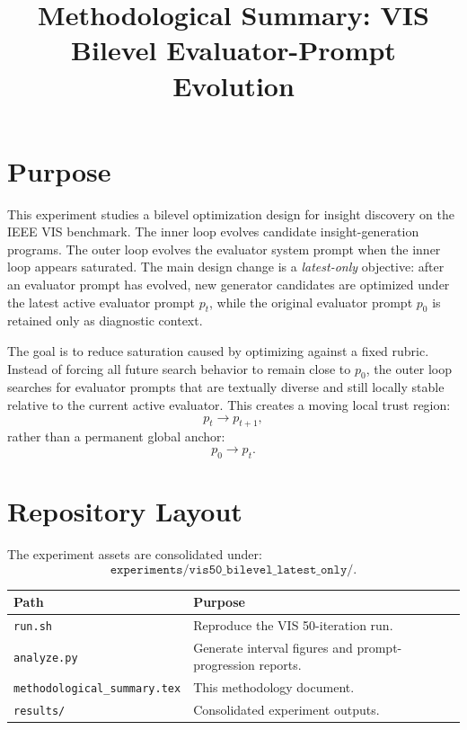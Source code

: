 \documentclass[11pt]{article}
\title{Methodological Summary: VIS Bilevel Evaluator-Prompt Evolution}
\author{}
\date{}
\begin{document}
\maketitle

\section{Purpose}

This experiment studies a bilevel optimization design for insight discovery on the
IEEE VIS benchmark. The inner loop evolves candidate insight-generation programs.
The outer loop evolves the evaluator system prompt when the inner loop appears
saturated. The main design change is a \emph{latest-only} objective: after an
evaluator prompt has evolved, new generator candidates are optimized under the
latest active evaluator prompt \(p_t\), while the original evaluator prompt
\(p_0\) is retained only as diagnostic context.

The goal is to reduce saturation caused by optimizing against a fixed rubric.
Instead of forcing all future search behavior to remain close to \(p_0\), the
outer loop searches for evaluator prompts that are textually diverse and still
locally stable relative to the current active evaluator. This creates a moving
local trust region:
\[
  p_t \rightarrow p_{t+1},
\]
rather than a permanent global anchor:
\[
  p_0 \rightarrow p_t.
\]

\section{Repository Layout}

The experiment assets are consolidated under:
\[
\texttt{experiments/vis50\_bilevel\_latest\_only/}.
\]

\begin{table}[h]
\centering
\begin{tabular}{ll}
\toprule
Path & Purpose \\
\midrule
\texttt{run.sh} & Reproduce the VIS 50-iteration run. \\
\texttt{analyze.py} & Generate interval figures and prompt-progression reports. \\
\texttt{methodological\_summary.tex} & This methodology document. \\
\texttt{results/} & Consolidated experiment outputs. \\
\bottomrule
\end{tabular}
\end{table}
\end{document}
